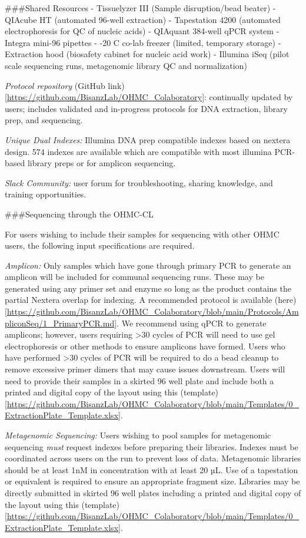 \documentclass[
]{book}
\begin{document}
\#\#\#Shared Resources
- Tissuelyzer III (Sample disruption/bead beater)
- QIAcube HT (automated 96-well extraction)
- Tapestation 4200 (automated electrophoresis for QC of nucleic acids)
- QIAquant 384-well qPCR system
- Integra mini-96 pipettes
- -20\ang{} C co-lab freezer (limited, temporary storage)
- Extraction hood (biosafety cabinet for nucleic acid work)
- Illumina iSeq (pilot scale sequencing runs, metagenomic library QC and normalization)

\emph{Protocol repository} (GitHub link){[}\url{https://github.com/BisanzLab/OHMC_Colaboratory}{]}: continually updated by users; includes validated and in-progress protocols for DNA extraction, library prep, and sequencing.

\emph{Unique Dual Indexes:} Illumina DNA prep compatible indexes based on nextera design. 574 indexes are available which are compatible with most illumina PCR-based library preps or for amplicon sequencing.

\emph{Slack Community:} user forum for troubleshooting, sharing knowledge, and training opportunities.

\#\#\#Sequencing through the OHMC-CL

For users wishing to include their samples for sequencing with other OHMC users, the following input specifications are required.

\emph{Amplicon:} Only samples which have gone through primary PCR to generate an amplicon will be included for communal sequencing runs. These may be generated using any primer set and enzyme so long as the product contains the partial Nextera overlap for indexing. A recommended protocol is available (here){[}\url{https://github.com/BisanzLab/OHMC_Colaboratory/blob/main/Protocols/AmpliconSeq/1_PrimaryPCR.md}{]}. We recommend using qPCR to generate amplicons; however, users requiring \textgreater30 cycles of PCR will need to use gel electrophoresis or other methods to ensure amplicons have formed. Users who have performed \textgreater30 cycles of PCR will be required to do a bead cleanup to remove excessive primer dimers that may cause issues downstream. Users will need to provide their samples in a skirted 96 well plate and include both a printed and digital copy of the layout using this (template){[}\url{https://github.com/BisanzLab/OHMC_Colaboratory/blob/main/Templates/0_ExtractionPlate_Template.xlsx}{]}.

\emph{Metagenomic Sequencing:} Users wishing to pool samples for metagenomic sequencing \emph{must} request indexes before preparing their libraries. Indexes must be coordinated across users on the run to prevent loss of data. Metagenomic libraries should be at least 1nM in concentration with at least 20 µL. Use of a tapestation or equivalent is required to ensure an appropriate fragment size. Libraries may be directly submitted in skirted 96 well plates including a printed and digital copy of the layout using this (template){[}\url{https://github.com/BisanzLab/OHMC_Colaboratory/blob/main/Templates/0_ExtractionPlate_Template.xlsx}{]}.
\end{document}

